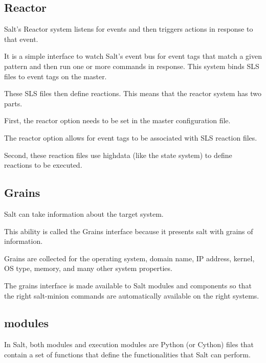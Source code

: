 \documentclass[12pt,a4paper,openright,twoside]{book}
\begin{document}

%

\subsection{Reactor}
Salt's Reactor system listens for events and then triggers actions in response to that event.

It is a simple interface to watch Salt's event bus for event tags that match a given pattern and then run one or more commands in response.
This system binds SLS files to event tags on the master.


These SLS files then define reactions. This means that the reactor system has two parts.


First, the reactor option needs to be set in the master configuration file.


The reactor option allows for event tags to be associated with SLS reaction files.


Second, these reaction files use highdata (like the state system) to define reactions to be executed.\cite{saltDocReactor}

\subsection{Grains}
Salt can take information about the target system.


This ability is called the Grains interface because it presents salt with grains of information.


Grains are collected for the operating system, domain name, IP address, kernel, OS type, memory, and many other system properties.


The grains interface is made available to Salt modules and components so that the right salt-minion commands are automatically available on the right systems.\cite{saltDocGrains}


\subsection{modules}
In Salt, both modules and execution modules are Python (or Cython) files that contain a set of functions that define the functionalities that Salt can perform.
\end{document}
